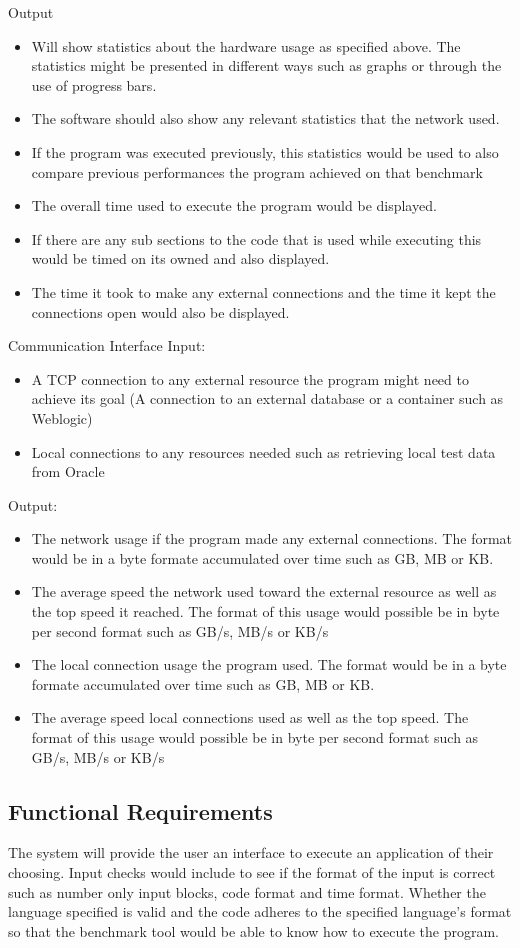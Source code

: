 \documentclass[a4paper,12pt]{article}
\begin{document}
Output
\begin{itemize}
\item Will show statistics about the hardware usage as specified above. The statistics might be presented in different ways such as graphs or through the use of progress bars. 
\item The software should also show any relevant statistics that the network used. 
\item If the program was executed previously, this statistics would be used to also compare previous performances the program achieved on that benchmark
\item The overall time used to execute the program would be displayed.
\item If there are any sub sections to the code that is used while executing this would be timed on its owned and also displayed.
\item The time it took to make any external connections and the time it kept the connections open would also be displayed.  
\end{itemize}
Communication Interface
Input:
\begin{itemize}
\item A TCP connection to any external resource the program might need to achieve its goal (A connection to an external database or a container such as Weblogic) 
\item Local connections to any resources needed such as retrieving local test data from Oracle
\end{itemize}
Output:
\begin{itemize}
\item The network usage if the program made any external connections. The format would be in a byte formate accumulated over time such as GB, MB or KB.
\item The average speed the network used toward the external resource as well as the top speed it reached. The format of this usage would possible be in byte per second format such as GB/s, MB/s or KB/s 
\item The local connection usage the program used. The format would be in a byte formate accumulated over time such as GB, MB or KB.
\item The average speed local connections used as well as the top speed. The format of this usage would possible be in byte per second format such as GB/s, MB/s or KB/s 
\end{itemize}


\subsection{Functional Requirements}
 The system will provide the user an interface to execute an application of their choosing. Input checks would include to see if the format of the input is correct such as number only input blocks, code format and time format. Whether the language specified is valid and the code adheres to the specified language's format so that the benchmark tool would be able to know how to execute the program. 
 
\end{document}

